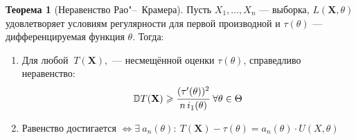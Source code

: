 \documentclass[oneside,final,14pt]{extreport}
\theoremstyle{plain}
\theoremstyle{definition}
\theoremstyle{named}
\newtheorem*{namedthm}{Теорема}
\begin{document}
\begin{namedthm}[Неравенство Рао"--~Крамера]
Пусть $X_1, \ldots, X_n$ — выборка, $L(\mathbf{X}, \theta)$ удовлетворяет условиям регулярности для первой производной и $\tau(\theta)$  —  дифференцируемая функция $\theta$. Тогда:
\begin{enumerate}
    \item Для любой $~T(\mathbf{X})$,~--- несмещённой оценки $\tau(\theta)$, справедливо неравенство:
    \begin{gather*}
        \mathbb{D} T(\mathbf{X}) \geqslant 
        \cfrac{(\tau'(\theta))^2}{n \, i_1(\theta)}
        ~\forall \theta \in \Theta%
    \end{gather*}
    
    \item Равенство достигается $\Leftrightarrow \exists~ a_n(\theta):~ T(\mathbf{X})-\tau(\theta)=a_{n}(\theta) \cdot U(X, \theta)$
\end{enumerate}
\end{namedthm}
\end{document}
